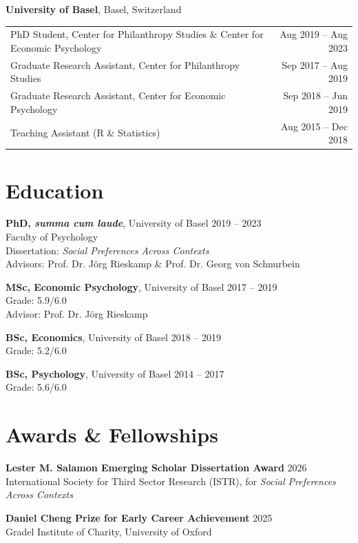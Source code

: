 \documentclass[11pt,letterpaper]{article}
\begin{document}
\vspace{0.5em}

\textbf{University of Basel}, Basel, Switzerland

\begin{tabular}{@{}p{}r@{}}
PhD Student, Center for Philanthropy Studies \& Center for Economic Psychology & Aug 2019 -- Aug 2023 \\
Graduate Research Assistant, Center for Philanthropy Studies & Sep 2017 -- Aug 2019 \\
Graduate Research Assistant, Center for Economic Psychology & Sep 2018 -- Jun 2019 \\
Teaching Assistant (R \& Statistics) & Aug 2015 -- Dec 2018 \\
\end{tabular}

\section*{Education}

\textbf{PhD, \textit{summa cum laude}}, University of Basel \hfill 2019 -- 2023 \\
Faculty of Psychology \\
Dissertation: \textit{Social Preferences Across Contexts} \\
Advisors: Prof. Dr. Jörg Rieskamp \& Prof. Dr. Georg von Schnurbein

\textbf{MSc, Economic Psychology}, University of Basel \hfill 2017 -- 2019 \\
Grade: 5.9/6.0 \\
Advisor: Prof. Dr. Jörg Rieskamp

\textbf{BSc, Economics}, University of Basel \hfill 2018 -- 2019 \\
Grade: 5.2/6.0

\textbf{BSc, Psychology}, University of Basel \hfill 2014 -- 2017 \\
Grade: 5.6/6.0

\section*{Awards \& Fellowships}

\textbf{Lester M. Salamon Emerging Scholar Dissertation Award} \hfill 2026 \\
International Society for Third Sector Research (ISTR), for \textit{Social Preferences Across Contexts}

\textbf{Daniel Cheng Prize for Early Career Achievement} \hfill 2025 \\
Gradel Institute of Charity, University of Oxford
\end{document}
